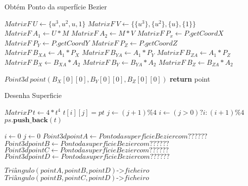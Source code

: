 
\begin{algorithm}
\caption{Obtém Ponto da superfície Bezier}
\label{alg:ssec2:leitura} 
\footnotesize %
\begin{algorithmic}[1]

\State $ MatrixF \ U \gets \{u^{3},u^{2},u,1\} $
\State $ MatrixF \ V \gets \{\{u^{3}\},\{u^{2}\},\{u\},\{1\}\} $
\State $ MatrixF \ A_{1} \gets U*M $ 
\State $ MatrixF \ A_{2} \gets M*V $ 
\State $ MatrixF \ P_{x} \gets P.getCoordX $ 
\State $ MatrixF \ P_{Y} \gets P.getCoordY $ 
\State $ MatrixF \ P_{Z} \gets P.getCoordZ $ 
\State $ MatrixF \ B_{XA} \gets A_{1}*P_{X} $
\State $ MatrixF \ B_{YA} \gets A_{1}*P_{Y} $
\State $ MatrixF \ B_{ZA} \gets A_{1}*P_{Z} $   
\State $ MatrixF \ B_{X} \gets B_{XA}*A_{2} $
\State $ MatrixF \ B_{Y} \gets B_{YA}*A_{2} $
\State $ MatrixF \ B_{Z} \gets B_{ZA}*A_{2} $   

\State $ Point3d \ point(B_{X}[0][0],B_{Y}[0][0],B_{Z}[0][0]) $
\State \textbf{return} point
\end{algorithmic}
\end{algorithm}


\begin{algorithm}
\caption{Desenha Superficie}
\label{alg:ssec2:leitura} 
\footnotesize %
\begin{algorithmic}[1]

\State $MatrixP \ t \gets 4*t^{4} $ 
\State $ t[i][j] = pt $
\State $ j \gets (j+1) \% 4 $
\State $ i \gets (j>0) ? i : (i+1) \%4 $
\EndFor
\State $ ps.\textbf{push_back}(t) $   


\State $ i \gets 0 $
\State $ j \gets 0 $
\State $ Point3d pointA \gets Ponto da superfície Bezier com ?????? $
\State $ Point3d pointB \gets Ponto da superfície Bezier com ?????? $
\State $ Point3d pointC\gets Ponto da superfície Bezier com ?????? $
\State $ Point3d pointD \gets Ponto da superfície Bezier com ?????? $

\State $Triângulo (pointA,pointB,pointD)\textbf{->} ficheiro$
\State $Triângulo (pointB,pointC,pointD)\textbf{->} ficheiro$

\end{algorithmic}
\end{algorithm}
